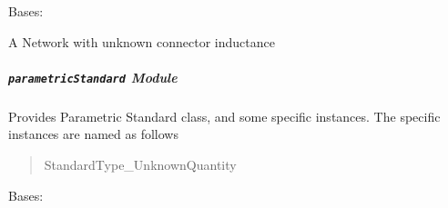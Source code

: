 \documentclass[letterpaper,10pt,english]{sphinxmanual}
\begin{document}

\begin{fulllineitems}
\label{api/mwavepy.calibration.parametricStandard:mwavepy.calibration.parametricStandard.generic.UnknownShuntInductance}
Bases: {\hyperref[api/mwavepy.calibration.parametricStandard:mwavepy.calibration.parametricStandard.parametricStandard.ParametricStandard]{}}

A Network with unknown connector inductance

\end{fulllineitems}



\subparagraph{\texttt{parametricStandard} Module}
\label{api/mwavepy.calibration.parametricStandard:parametricstandard-module}\label{api/mwavepy.calibration.parametricStandard:module-mwavepy.calibration.parametricStandard.parametricStandard}
Provides Parametric Standard class, and some specific instances. The 
specific instances are named as follows
\begin{quote}

StandardType\_UnknownQuantity
\end{quote}

\begin{fulllineitems}
\label{api/mwavepy.calibration.parametricStandard:mwavepy.calibration.parametricStandard.parametricStandard.ParameterBoundsError}
Bases: 

\end{fulllineitems}

\end{document}
